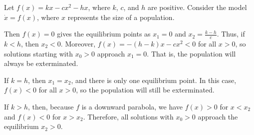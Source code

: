 \documentclass[nonumber]{homework}
\begin{document}
	\maketitle
	
	
	
	Let $f(x) = kx - cx^2 -hx$, where $k$, $c$, and $h$ are positive. Consider the model $\dot{x} = f(x)$, where $x$ represents the size of a population.
	
	Then $f(x) = 0$ gives the equilibrium points as $x_1=0$ and $x_2 = \frac{k-h}{c}$. Thus, if $k < h$, then $x_2 < 0$. Moreover, $f(x) = -(h-k)x - cx^2 < 0$ for all $x > 0$, so solutions starting with $x_0 > 0$ approach $x_1 = 0$. That is, the population will always be exterminated.
	
	If $k = h$, then $x_1 = x_2$, and there is only one equilibrium point. In this case, $f(x) < 0$ for all $x > 0$, so the population will still be exterminated. 
	
	If $k > h$, then, because $f$ is a downward parabola, we have $f(x) > 0$ for $x < x_2$ and $f(x) < 0$ for $x > x_2$. Therefore, all solutions with $x_0 > 0$ approach the equilibrium $x_2>0$.
	
	
	\begin{alphaparts}
		\questionpart
		
		\questionpart
	\end{alphaparts}
\end{document}
